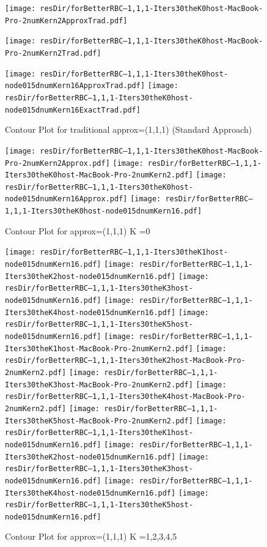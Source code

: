 \documentclass[12pt]{article}
\begin{document}
\begin{figure}
  \centering
\ifmacosx


  \texttt{[image: resDir/forBetterRBC--1,1,1-Iters30theK0host-MacBook-Pro-2numKern2ApproxTrad.pdf]}

  \texttt{[image: resDir/forBetterRBC--1,1,1-Iters30theK0host-MacBook-Pro-2numKern2Trad.pdf]}

\fi
\iflinux
\texttt{[image: resDir/forBetterRBC--1,1,1-Iters30theK0host-node015dnumKern16ApproxTrad.pdf]}
\texttt{[image: resDir/forBetterRBC--1,1,1-Iters30theK0host-node015dnumKern16ExactTrad.pdf]}
\fi
  \caption{Contour Plot for traditional approx=(1,1,1) (Standard Approach)}
  \label{fig:tradOne}
\end{figure}


\begin{figure}
  \centering
\ifmacosx
  \texttt{[image: resDir/forBetterRBC--1,1,1-Iters30theK0host-MacBook-Pro-2numKern2Approx.pdf]}
  \texttt{[image: resDir/forBetterRBC--1,1,1-Iters30theK0host-MacBook-Pro-2numKern2.pdf]}
\fi
\iflinux
\texttt{[image: resDir/forBetterRBC--1,1,1-Iters30theK0host-node015dnumKern16Approx.pdf]}
\texttt{[image: resDir/forBetterRBC--1,1,1-Iters30theK0host-node015dnumKern16.pdf]}
\fi
  \caption{Contour Plot for approx=(1,1,1) K =0 }
  \label{fig:cntpltA}
\end{figure}




\begin{figure}
  \centering
\iflinux
\texttt{[image: resDir/forBetterRBC--1,1,1-Iters30theK1host-node015dnumKern16.pdf]}
\texttt{[image: resDir/forBetterRBC--1,1,1-Iters30theK2host-node015dnumKern16.pdf]}
\texttt{[image: resDir/forBetterRBC--1,1,1-Iters30theK3host-node015dnumKern16.pdf]}
\texttt{[image: resDir/forBetterRBC--1,1,1-Iters30theK4host-node015dnumKern16.pdf]}
\texttt{[image: resDir/forBetterRBC--1,1,1-Iters30theK5host-node015dnumKern16.pdf]}
\fi
\ifmacosx
\texttt{[image: resDir/forBetterRBC--1,1,1-Iters30theK1host-MacBook-Pro-2numKern2.pdf]}
\texttt{[image: resDir/forBetterRBC--1,1,1-Iters30theK2host-MacBook-Pro-2numKern2.pdf]}
\texttt{[image: resDir/forBetterRBC--1,1,1-Iters30theK3host-MacBook-Pro-2numKern2.pdf]}
\texttt{[image: resDir/forBetterRBC--1,1,1-Iters30theK4host-MacBook-Pro-2numKern2.pdf]}
\texttt{[image: resDir/forBetterRBC--1,1,1-Iters30theK5host-MacBook-Pro-2numKern2.pdf]}
\fi
\iflinux
\texttt{[image: resDir/forBetterRBC--1,1,1-Iters30theK1host-node015dnumKern16.pdf]}
\texttt{[image: resDir/forBetterRBC--1,1,1-Iters30theK2host-node015dnumKern16.pdf]}
\texttt{[image: resDir/forBetterRBC--1,1,1-Iters30theK3host-node015dnumKern16.pdf]}
\texttt{[image: resDir/forBetterRBC--1,1,1-Iters30theK4host-node015dnumKern16.pdf]}
\texttt{[image: resDir/forBetterRBC--1,1,1-Iters30theK5host-node015dnumKern16.pdf]}
\fi
  \caption{Contour Plot for approx=(1,1,1)  K =1,2,3,4,5}
  \label{fig:cntpltB}
\end{figure}
\end{document}
